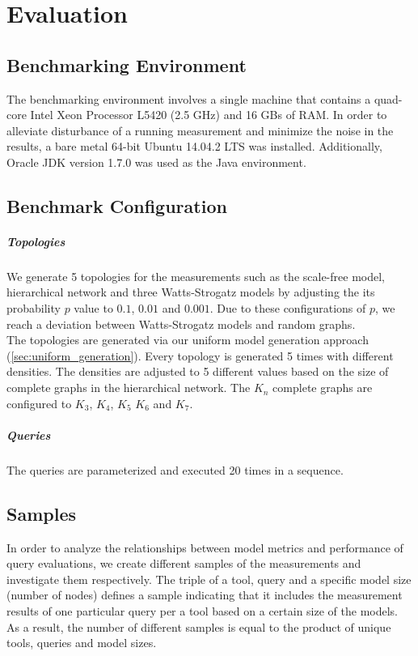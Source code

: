 
\chapter{Evaluation}

\section{Benchmarking Environment}

The benchmarking environment involves a single machine that contains a quad-core Intel Xeon Processor L5420 (2.5 GHz) and 16 GBs of RAM. In order to alleviate disturbance of a running measurement and minimize the noise in the results, a bare metal 64-bit Ubuntu 14.04.2 LTS was installed. Additionally, Oracle JDK version 1.7.0 was used as the Java environment.

\section{Benchmark Configuration}

\paragraph{Topologies}

We generate 5 topologies for the measurements such as the scale-free model, hierarchical network and three Watts-Strogatz models by adjusting the its probability $p$ value to $0.1$, $0.01$ and $0.001$. Due to these configurations of $p$, we reach a deviation between Watts-Strogatz models and random graphs.\\ The topologies are generated via our uniform model generation approach (\ref{sec:uniform_generation}).
Every topology is generated 5 times with different densities. The densities are adjusted to 5 different values based on the size of complete graphs in the hierarchical network. The $K_n$ complete graphs are configured to $K_3$, $K_4$, $K_5$ $K_6$ and $K_7$.

\paragraph{Queries}
The queries are parameterized and executed 20 times in a sequence.

\section{Samples}

In order to analyze the relationships between model metrics and performance of query evaluations, we create different samples of the measurements and investigate them respectively. The triple of a tool, query and a specific model size (number of nodes) defines a sample indicating that it includes the measurement results of one particular query per a tool based on a certain size of the models. As a result, the number of different samples is equal to the product of unique tools, queries and model sizes.

